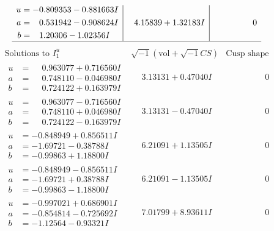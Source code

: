 \documentclass[1p]{elsarticle_modified}
\theoremstyle{definition}
\newcommand{\I}{\sqrt{-1}}
\begin{document}
$$\begin{array}{c|c|c}
\begin{aligned}
u &= -0.809353 - 0.881663 I \\
a &= \phantom{-}0.531942 - 0.908624 I \\
b &= \phantom{-}1.20306 - 1.02356 I\end{aligned}
 & \phantom{-}4.15839 + 1.32183 I & \phantom{-0.000000 } 0\\
 \hline 
 \end{array}$$\newpage$$\begin{array}{c|c|c}  
\text{Solutions to }I^u_{1}& \I (\text{vol} + \sqrt{-1}CS) & \text{Cusp shape}\\
 \hline 
\begin{aligned}
u &= \phantom{-}0.963077 + 0.716560 I \\
a &= \phantom{-}0.748110 - 0.046980 I \\
b &= \phantom{-}0.724122 + 0.163979 I\end{aligned}
 & \phantom{-}3.13131 + 0.47040 I & \phantom{-0.000000 } 0 \\ \hline\begin{aligned}
u &= \phantom{-}0.963077 - 0.716560 I \\
a &= \phantom{-}0.748110 + 0.046980 I \\
b &= \phantom{-}0.724122 - 0.163979 I\end{aligned}
 & \phantom{-}3.13131 - 0.47040 I & \phantom{-0.000000 } 0 \\ \hline\begin{aligned}
u &= -0.848949 + 0.856511 I \\
a &= -1.69721 - 0.38788 I \\
b &= -0.99863 + 1.18800 I\end{aligned}
 & \phantom{-}6.21091 + 1.13505 I & \phantom{-0.000000 } 0 \\ \hline\begin{aligned}
u &= -0.848949 - 0.856511 I \\
a &= -1.69721 + 0.38788 I \\
b &= -0.99863 - 1.18800 I\end{aligned}
 & \phantom{-}6.21091 - 1.13505 I & \phantom{-0.000000 } 0 \\ \hline\begin{aligned}
u &= -0.997021 + 0.686901 I \\
a &= -0.854814 - 0.725692 I \\
b &= -1.12564 - 0.93321 I\end{aligned}
 & \phantom{-}7.01799 + 8.93611 I & \phantom{-0.000000 } 0 \\ \hline\begin{aligned}

\end{aligned}
\end{array}$$
\end{document}
